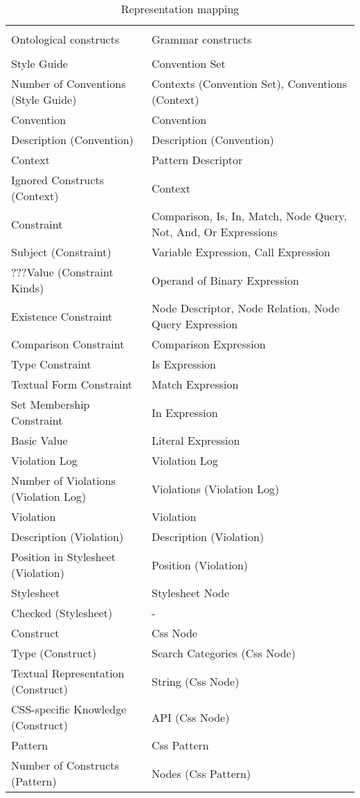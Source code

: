 \documentclass[parskip=full]{uvamscse}
\begin{document}
\begin{center}
\begin{longtable}{ | p{17em} | p{23em} | } 
\caption{Representation mapping}
\label{tab:representation}\\
\hline
 &  \\
Ontological constructs & Grammar constructs \\
 &  \\
\hline
Style Guide & Convention Set \\ \hline
Number of Conventions (Style Guide) & Contexts (Convention Set), Conventions (Context) \\ \hline
Convention & Convention \\ \hline
Description (Convention) & Description (Convention) \\ \hline
Context & Pattern Descriptor \\ \hline
Ignored Constructs (Context) &  Context \\ \hline

Constraint & Comparison, Is, In, Match, Node Query, Not, And, Or Expressions \\ \hline
Subject (Constraint) & Variable Expression, Call Expression \\ \hline
???Value (Constraint Kinds) & Operand of Binary Expression \\ \hline
Existence Constraint & Node Descriptor, Node Relation, Node Query Expression \\ \hline
Comparison Constraint & Comparison Expression \\ \hline
Type Constraint & Is Expression \\ \hline
Textual Form Constraint & Match Expression \\ \hline
Set Membership Constraint & In Expression \\ \hline
Basic Value & Literal Expression \\ \hline

Violation Log & Violation Log \\ \hline
Number of Violations (Violation Log) & Violations (Violation Log) \\ \hline
Violation & Violation \\ \hline
Description (Violation) & Description (Violation) \\ \hline
Position in Stylesheet (Violation) & Position (Violation) \\ \hline

Stylesheet & Stylesheet Node \\ \hline
Checked (Stylesheet) & - \\ \hline
Construct & Css Node \\ \hline
Type (Construct) & Search Categories (Css Node) \\ \hline
Textual Representation (Construct) & String (Css Node) \\ \hline
CSS-specific Knowledge (Construct) & API (Css Node) \\ \hline
Pattern & Css Pattern \\ \hline
Number of Constructs (Pattern) & Nodes (Css Pattern) \\ \hline


\end{longtable}
\end{center}
\end{document}
